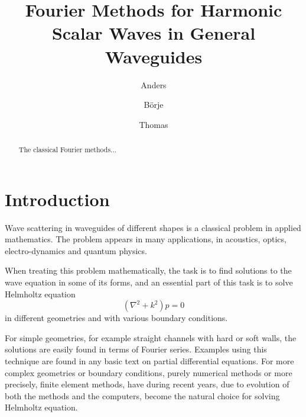 \documentclass[numreferences]{kluwer}
\begin{document}
  \begin{opening}
    \title{Fourier Methods for Harmonic Scalar Waves in General
      Waveguides}

    \author{Anders}
    \author{B\"orje}
    \author{Thomas}
    \begin{abstract}
      The classical Fourier methods...
    \end{abstract}
  \end{opening}

\section{Introduction}
\label{sec:intro}

Wave scattering in waveguides of different shapes is a classical
problem in applied mathematics. The problem appears in many
applications, in acoustics, optics, electro-dynamics and quantum
physics.

When treating this problem mathematically, the task is to find
solutions to the wave equation in some of its forms, and an essential
part of this task is to solve Helmholtz equation
\begin{equation}
  \label{eq:Helmholtz1}
  (\nabla^2+k^2)p=0
\end{equation}
in different geometries and with various boundary conditions.

For simple geometries, for example straight channels with hard or soft
walls, the solutions are easily found in terms of Fourier
series. Examples using this technique are found in any basic text on
partial differential equations. For more complex geometries or
boundary conditions, purely numerical methods or more precisely, finite
element methods, have during recent years, due to evolution of both
the methods and the computers, become the natural choice for solving
Helmholtz equation.

\end{document}
